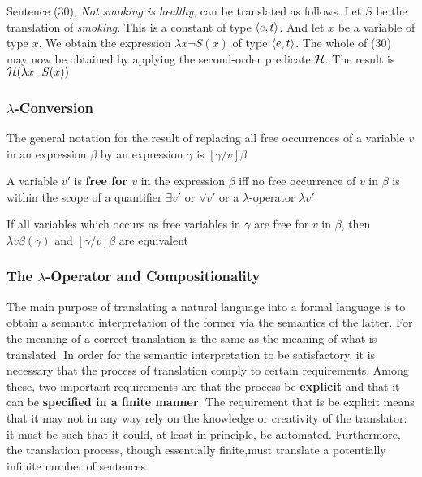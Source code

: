 \documentclass[11pt]{article}
\begin{document}
Sentence (30), \emph{Not smoking is healthy}, can be translated as follows. Let
\(S\) be the translation of \emph{smoking}. This is a constant of type \(\langle
    e,t\rangle\). And let \(x\) be a variable of type \(x\). We obtain the
expression \(\lambda x\neg S(x)\) of type \(\langle e,t\rangle\). The whole of (30) may
now be obtained by applying the second-order predicate \(\mathcal{H}\). The result
is \(\mathcal{H}(\lambda x\neg S(x))\)
\subsubsection{\(λ\)-Conversion}
\label{sec:org30290b9}
The general notation for the result of replacing all free occurrences of a
variable \(v\) in an expression \(\beta\) by an expression \(\gamma\) is \([\gamma/v]\beta\)

\begin{definition}[]
A variable \(v'\) is \textbf{free for \(v\)}  in the expression \(\beta\) iff no free
occurrence of \(v\) in \(\beta\) is within the scope of a quantifier \(\exists v'\)
or \(\forall v'\) or a \(\lambda\)-operator \(\lambda v'\)
\end{definition}

\begin{theorem}[]
If all variables which occurs as free variables in \(\gamma\) are free for \(v\) in
\(\beta\), then \(\lambda v\beta(\gamma)\) and \([\gamma/v]\beta\) are equivalent
\end{theorem}
\subsubsection{The \(λ\)-Operator and Compositionality}
\label{sec:org57cc3cb}
The main purpose of translating a natural language into a formal language is
to obtain a semantic interpretation of the former via the semantics of the
latter. For the meaning of a correct translation is the same as the meaning
of what is translated. In order for the semantic interpretation to be
satisfactory, it is necessary that the process of translation comply to
certain requirements. Among these, two important requirements are that the
process be \textbf{explicit} and that it can be \textbf{specified in a finite manner}.  The
requirement that is be explicit means that it may not in any way rely on the
knowledge or creativity of the translator: it must be such that it could, at
least in principle, be automated. Furthermore, the translation process,
though essentially finite,must translate a potentially infinite number of
sentences.
\end{document}
